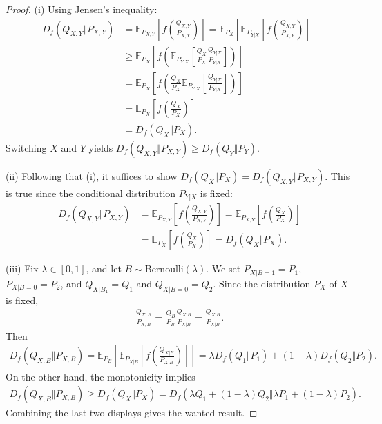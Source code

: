 \documentclass{article}
\numberwithin{equation}{section}
\newcommand{\E}{\mathbb{E}}
\theoremstyle{plain}
\theoremstyle{definition}
\begin{document}
\begin{proof}
(i) Using Jensen's inequality:
\begin{align*}
	D_f(Q_{X,Y}\Vert P_{X,Y})&=\E_{P_{X,Y}}\left[f\left(\frac{Q_{X,Y}}{P_{X,Y}}\right)\right]=\E_{P_X}\left[\E_{P_{Y|X}}\left[f\left(\frac{Q_{X,Y}}{P_{X,Y}}\right)\right]\right]\\
	&\geq\E_{P_X}\left[f\left(\E_{P_{Y|X}}\left[\frac{Q_{X}}{P_{X}}\frac{Q_{Y|X}}{P_{Y|X}}\right]\right)\right]\\
	&=\E_{P_X}\left[f\left(\frac{Q_{X}}{P_{X}}\E_{P_{Y|X}}\left[\frac{Q_{Y|X}}{P_{Y|X}}\right]\right)\right]\\
	&=\E_{P_X}\left[f\left(\frac{Q_{X}}{P_{X}}\right)\right]\\
	&=D_f(Q_X\Vert P_X).
\end{align*}
Switching $X$ and $Y$ yields $D_f(Q_{X,Y}\Vert P_{X,Y})\geq D_f(Q_Y\Vert P_Y)$.\vspace{0.12cm}

(ii) Following that (i), it suffices to show $D_f(Q_X\Vert P_X)=D_f(Q_{X,Y}\Vert P_{X,Y})$. This is true since the conditional distribution $P_{Y|X}$ is fixed:
\begin{align*}
	D_f(Q_{X,Y}\Vert P_{X,Y})&=\E_{P_{X,Y}}\left[f\left(\frac{Q_{X,Y}}{P_{X,Y}}\right)\right]=\E_{P_{X,Y}}\left[f\left(\frac{Q_{X}}{P_{X}}\right)\right]\\
	&=\E_{P_X}\left[f\left(\frac{Q_{X}}{P_{X}}\right)\right]=D_f(Q_X\Vert P_X).
\end{align*}

(iii) Fix $\lambda\in[0,1]$, and let $B\sim\mathrm{Bernoulli}(\lambda)$. We set $P_{X|B=1}=P_1$, $P_{X|B=0}=P_2$, and $Q_{X|B_1}=Q_1$ and $Q_{X|B=0}=Q_2$. Since the distribution $P_X$ of $X$ is fixed,
\begin{align*}
	\frac{Q_{X,B}}{P_{X,B}}=\frac{Q_B}{P_B}\frac{Q_{X|B}}{P_{X|B}}=\frac{Q_{X|B}}{P_{X|B}}.
\end{align*}
Then
\begin{align*}
	D_f(Q_{X,B}\Vert P_{X,B})=\E_{P_B}\left[\E_{P_{X|B}}\left[ f\left(\frac{Q_{X|B}}{P_{X|B}}\right)\right]\right]=\lambda D_f(Q_1\Vert P_1)+(1-\lambda)D_f(Q_2\Vert P_2).
\end{align*}
On the other hand, the monotonicity implies
\begin{align*}
	D_f(Q_{X,B}\Vert P_{X,B})\geq D_f(Q_X\Vert P_X)=D_f\left(\lambda Q_1+(1-\lambda)Q_2\Vert\lambda P_1+(1-\lambda)P_2\right).
\end{align*}
Combining the last two displays gives the wanted result.\vspace{0.12cm}


\end{proof}
\end{document}
